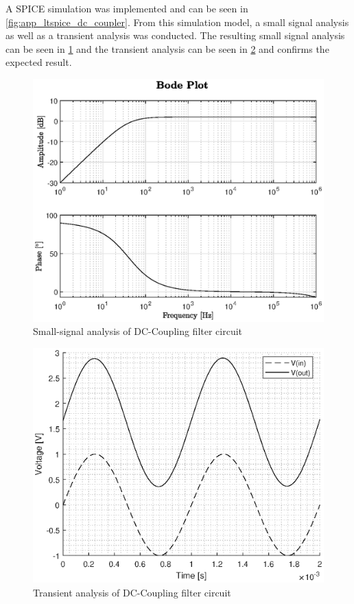 A SPICE simulation was implemented and can be seen in \cref{fig:app_ltspice_dc_coupler}. From this simulation model, a small signal analysis as well as a transient analysis was conducted. The resulting small signal analysis can be seen in \cref{fig:3_dccoupler_sim_ac} and the transient analysis can be seen in \cref{fig:3_dccoupler_sim_transient} and confirms the expected result.
\begin{figure}[htbp]
	\centering
	\includegraphics[width=.8\textwidth]{Figures/3_dc_coupler_sim.eps}
	\caption{Small-signal analysis of DC-Coupling filter circuit}
	\label{fig:3_dccoupler_sim_ac}
\end{figure}
\begin{figure}[htbp]
	\centering
	\includegraphics[width=.8\textwidth]{Figures/3_dc_coupler_sim_transient.eps}
	\caption{Transient analysis of DC-Coupling filter circuit}
	\label{fig:3_dccoupler_sim_transient}
\end{figure}
